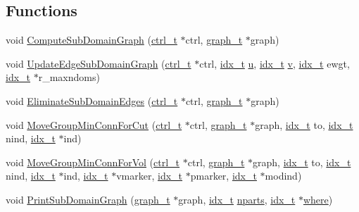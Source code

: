\subsection*{Functions}
\begin{DoxyCompactItemize}
\item 
void \hyperlink{a00242_a78c50bcdffefbd90914a77c4add573cc}{Compute\+Sub\+Domain\+Graph} (\hyperlink{a00742}{ctrl\+\_\+t} $\ast$ctrl, \hyperlink{a00734}{graph\+\_\+t} $\ast$graph)
\item 
void \hyperlink{a00242_a004451dc6b5a9ebe36a063f7bcd6495a}{Update\+Edge\+Sub\+Domain\+Graph} (\hyperlink{a00742}{ctrl\+\_\+t} $\ast$ctrl, \hyperlink{a00876_aaa5262be3e700770163401acb0150f52}{idx\+\_\+t} \hyperlink{a00605_a6277e2a7446059985dc9bcf0a4ac1a8f}{u}, \hyperlink{a00876_aaa5262be3e700770163401acb0150f52}{idx\+\_\+t} \hyperlink{a00605_ac4055e3a20b6b3af3d10590ea446ef6c}{v}, \hyperlink{a00876_aaa5262be3e700770163401acb0150f52}{idx\+\_\+t} ewgt, \hyperlink{a00876_aaa5262be3e700770163401acb0150f52}{idx\+\_\+t} $\ast$r\+\_\+maxndoms)
\item 
void \hyperlink{a00242_a6dab60a85abb88ada807831e84cb84fc}{Eliminate\+Sub\+Domain\+Edges} (\hyperlink{a00742}{ctrl\+\_\+t} $\ast$ctrl, \hyperlink{a00734}{graph\+\_\+t} $\ast$graph)
\item 
void \hyperlink{a00242_a39d997df18cf07ea8609a66db133a8b6}{Move\+Group\+Min\+Conn\+For\+Cut} (\hyperlink{a00742}{ctrl\+\_\+t} $\ast$ctrl, \hyperlink{a00734}{graph\+\_\+t} $\ast$graph, \hyperlink{a00876_aaa5262be3e700770163401acb0150f52}{idx\+\_\+t} to, \hyperlink{a00876_aaa5262be3e700770163401acb0150f52}{idx\+\_\+t} nind, \hyperlink{a00876_aaa5262be3e700770163401acb0150f52}{idx\+\_\+t} $\ast$ind)
\item 
void \hyperlink{a00242_acab0293e31c438218cd4b37b608466c6}{Move\+Group\+Min\+Conn\+For\+Vol} (\hyperlink{a00742}{ctrl\+\_\+t} $\ast$ctrl, \hyperlink{a00734}{graph\+\_\+t} $\ast$graph, \hyperlink{a00876_aaa5262be3e700770163401acb0150f52}{idx\+\_\+t} to, \hyperlink{a00876_aaa5262be3e700770163401acb0150f52}{idx\+\_\+t} nind, \hyperlink{a00876_aaa5262be3e700770163401acb0150f52}{idx\+\_\+t} $\ast$ind, \hyperlink{a00876_aaa5262be3e700770163401acb0150f52}{idx\+\_\+t} $\ast$vmarker, \hyperlink{a00876_aaa5262be3e700770163401acb0150f52}{idx\+\_\+t} $\ast$pmarker, \hyperlink{a00876_aaa5262be3e700770163401acb0150f52}{idx\+\_\+t} $\ast$modind)
\item 
void \hyperlink{a00242_a9723ce68d6093abc3aca1086e672cde9}{Print\+Sub\+Domain\+Graph} (\hyperlink{a00734}{graph\+\_\+t} $\ast$graph, \hyperlink{a00876_aaa5262be3e700770163401acb0150f52}{idx\+\_\+t} \hyperlink{a00879_aad88065af88fd6759101788a8e15ce9e}{nparts}, \hyperlink{a00876_aaa5262be3e700770163401acb0150f52}{idx\+\_\+t} $\ast$\hyperlink{a00879_a7a355801f721e9d8d4ae03590a3a56b0}{where})
\end{DoxyCompactItemize}


